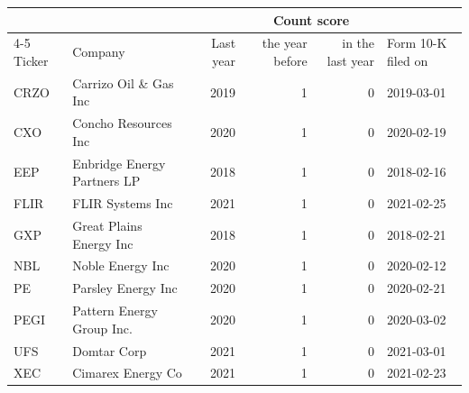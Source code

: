 \begin{tabular}{llrrrl}
\toprule
 & & & \multicolumn{2}{c}{Count score} & \\
\cmidrule(lr){4-5}
Ticker & Company & Last year & the year before & in the last year & Form 10-K filed on \\
\midrule
CRZO & Carrizo Oil \& Gas Inc & 2019 & 1 & 0 & 2019-03-01 \\
CXO & Concho Resources Inc & 2020 & 1 & 0 & 2020-02-19 \\
EEP & Enbridge Energy Partners LP & 2018 & 1 & 0 & 2018-02-16 \\
FLIR & FLIR Systems Inc & 2021 & 1 & 0 & 2021-02-25 \\
GXP & Great Plains Energy Inc & 2018 & 1 & 0 & 2018-02-21 \\
NBL & Noble Energy Inc & 2020 & 1 & 0 & 2020-02-12 \\
PE & Parsley Energy Inc & 2020 & 1 & 0 & 2020-02-21 \\
PEGI & Pattern Energy Group Inc. & 2020 & 1 & 0 & 2020-03-02 \\
UFS & Domtar Corp & 2021 & 1 & 0 & 2021-03-01 \\
XEC & Cimarex Energy Co & 2021 & 1 & 0 & 2021-02-23 \\
\bottomrule
\end{tabular}
